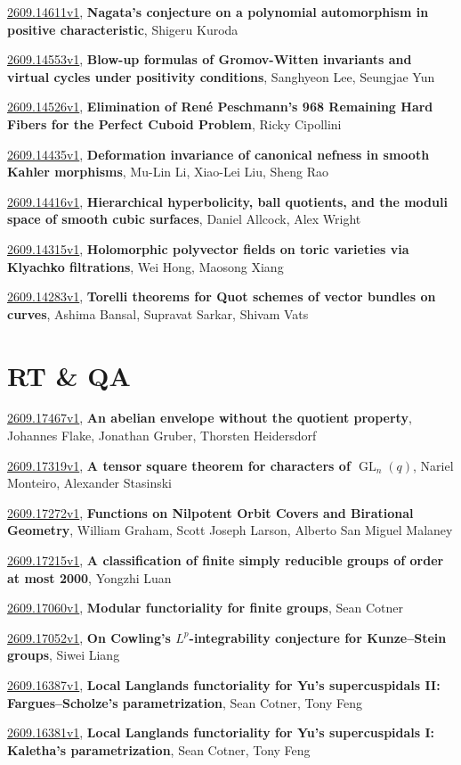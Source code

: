 \documentclass[9pt, a4paper]{article}
\theoremstyle{plain}
\theoremstyle{definition}
\theoremstyle{remark}
\newcommand{\arxiv}[3]{\href{https://arxiv.org/abs/#1}{#1}, \textbf{\textcolor{arxivblue}{#2}}, #3}
\begin{document}
\arxiv{2609.14611v1}{Nagata's conjecture on a polynomial automorphism in positive characteristic}{Shigeru Kuroda}

\arxiv{2609.14553v1}{Blow-up formulas of Gromov-Witten invariants and virtual cycles under positivity conditions}{Sanghyeon Lee, Seungjae Yun}

\arxiv{2609.14526v1}{Elimination of René Peschmann's 968 Remaining Hard Fibers for the Perfect Cuboid Problem}{Ricky Cipollini}

\arxiv{2609.14435v1}{Deformation invariance of canonical nefness in smooth Kahler morphisms}{Mu-Lin Li, Xiao-Lei Liu, Sheng Rao}

\arxiv{2609.14416v1}{Hierarchical hyperbolicity, ball quotients, and the moduli space of smooth cubic surfaces}{Daniel Allcock, Alex Wright}

\arxiv{2609.14315v1}{Holomorphic polyvector fields on toric varieties via Klyachko filtrations}{Wei Hong, Maosong Xiang}

\arxiv{2609.14283v1}{Torelli theorems for Quot schemes of vector bundles on curves}{Ashima Bansal, Supravat Sarkar, Shivam Vats}


\section{RT \& QA}
\arxiv{2609.17467v1}{An abelian envelope without the quotient property}{Johannes Flake, Jonathan Gruber, Thorsten Heidersdorf}

\arxiv{2609.17319v1}{A tensor square theorem for characters of $\operatorname{GL}_{n}(q)$}{Nariel Monteiro, Alexander Stasinski}

\arxiv{2609.17272v1}{Functions on Nilpotent Orbit Covers and Birational Geometry}{William Graham, Scott Joseph Larson, Alberto San Miguel Malaney}

\arxiv{2609.17215v1}{A classification of finite simply reducible groups of order at most 2000}{Yongzhi Luan}

\arxiv{2609.17060v1}{Modular functoriality for finite groups}{Sean Cotner}

\arxiv{2609.17052v1}{On Cowling's $L^p$-integrability conjecture for Kunze--Stein groups}{Siwei Liang}

\arxiv{2609.16387v1}{Local Langlands functoriality for Yu's supercuspidals II: Fargues--Scholze's parametrization}{Sean Cotner, Tony Feng}

\arxiv{2609.16381v1}{Local Langlands functoriality for Yu's supercuspidals I: Kaletha's parametrization}{Sean Cotner, Tony Feng}
\end{document}
